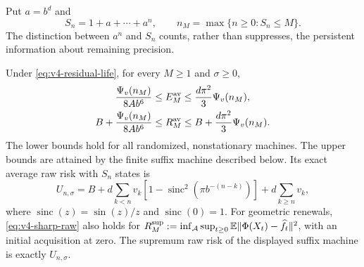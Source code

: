 Put $a=b^d$ and
\begin{equation}
 S_n=1+a+\cdots+a^n,\qquad
 n_M=\max\{n\ge0:S_n\le M\}.                                   \label{eq:v4-state-budget}
\end{equation}
The distinction between $a^n$ and $S_n$ counts, rather than suppresses,
the persistent information about remaining precision.

\begin{theorem}\label{thm:v4-noisy}
Under \eqref{eq:v4-residual-life}, for every $M\ge1$ and $\sigma\ge0$,
\begin{align}
 \frac{\Psi_v(n_M)}{8Ab^6}
 &\le E_M^{\rm av}\le \frac{d\pi^2}{3}\Psi_v(n_M),                \label{eq:v4-sharp-excess}\\
 B+\frac{\Psi_v(n_M)}{8Ab^6}
 &\le R_M^{\rm av}\le B+\frac{d\pi^2}{3}\Psi_v(n_M).             \label{eq:v4-sharp-raw}
\end{align}
The lower bounds hold for all randomized, nonstationary machines.
The upper bounds are attained by the finite suffix machine described
below. Its exact average raw risk with $S_n$ states is
\begin{equation}
 U_{n,\sigma}
 =B+d\sum_{k<n}v_k
       \left[1-\operatorname{sinc}^2(\pi b^{-(n-k)})\right]
       +d\sum_{k\ge n}v_k,                                     \label{eq:v4-exact-suffix}
\end{equation}
where $\operatorname{sinc}(z)=\sin(z)/z$ and $\operatorname{sinc}(0)=1$.
For geometric renewals, \eqref{eq:v4-sharp-raw} also holds for
$R_M^{\rm sup}:=\inf_{\mathcal A}\sup_{t\ge0}
\mathbb E\|\Phi(X_t)-\widehat f_t\|^2$, with an initial acquisition at zero.
The supremum raw risk of the displayed suffix machine is exactly
$U_{n,\sigma}$.
\end{theorem}

